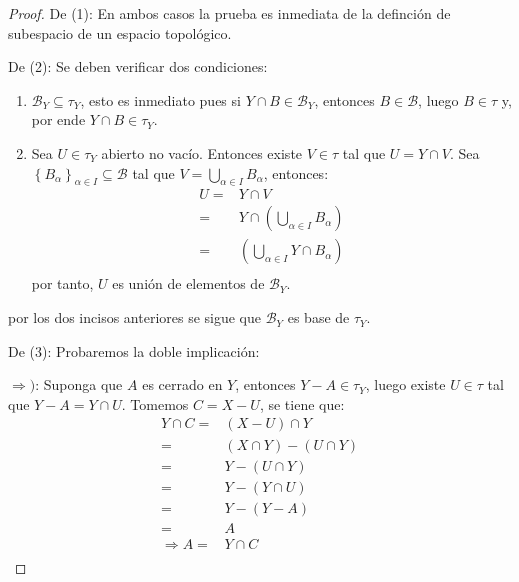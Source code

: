 \documentclass[12pt]{report}
\theoremstyle{largebreak}
\begin{document}
    \begin{proof}
        De (1): En ambos casos la prueba es inmediata de la definción de subespacio de un espacio topológico.

        De (2): Se deben verificar dos condiciones:
        \begin{enumerate}
            \item $\mathcal{B}_Y\subseteq\tau_Y$, esto es inmediato pues si $Y\cap B\in\mathcal{B}_Y$, entonces $B\in\mathcal{B}$, luego $B\in\tau$ y, por ende $Y\cap B\in\tau_Y$.
            \item Sea $U\in\tau_Y$ abierto no vacío. Entonces existe $V\in\tau$ tal que $U=Y\cap V$. Sea $\left\{B_\alpha \right\}_{\alpha\in I}\subseteq\mathcal{B}$ tal que $V=\bigcup_{\alpha\in I}B_\alpha$, entonces:
            \begin{equation*}
                \begin{split}
                    U=&Y\cap V\\
                =&Y\cap\left(\bigcup_{\alpha\in I}B_\alpha\right) \\
                =&\left(\bigcup_{\alpha\in I}Y\cap B_\alpha\right) \\
                \end{split}
            \end{equation*}
            por tanto, $U$ es unión de elementos de $\mathcal{B}_Y$.
        \end{enumerate}
        
        por los dos incisos anteriores se sigue que $\mathcal{B}_Y$ es base de $\tau_Y$.

        De (3): Probaremos la doble implicación:
        
        $\Rightarrow)$: Suponga que $A$ es cerrado en $Y$, entonces $Y-A\in\tau_Y$, luego existe $U\in\tau$ tal que $Y-A=Y\cap U$. Tomemos $C=X-U$, se tiene que:
        \begin{equation*}
            \begin{split}
                Y\cap C=&(X-U)\cap Y\\
                =&(X\cap Y)-(U\cap Y)\\
                =&Y-(U\cap Y)\\
                =&Y-(Y\cap U)\\
                =&Y-(Y-A)\\
                =&A\\
                \Rightarrow A=& Y\cap C\\
            \end{split}
        \end{equation*}
        

\end{proof}
\end{document}
